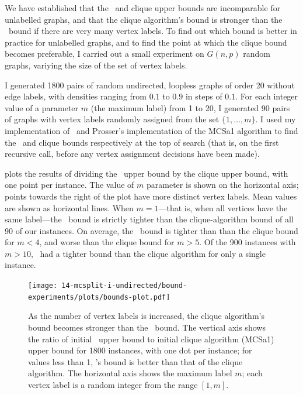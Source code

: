 We have established that the \McSplit\ and clique upper bounds are incomparable for unlabelled graphs,
and that the clique algorithm's bound is stronger than the \McSplit\ bound if there are very many vertex
labels.  To find out which bound is better in practice for unlabelled graphs, and to find the point
at which the clique bound becomes preferable, I carried out a small experiment on $G(n,p)$ random graphs,
variying the size of the set of vertex labels.

I generated 1800 pairs of random undirected, loopless graphs of order 20 without edge labels,
with densities ranging from $0.1$ to $0.9$
in steps of $0.1$.  For each integer value of a parameter $m$ (the maximum label) from 1 to 20, I generated
90 pairs of graphs with vertex labels randomly assigned from the set $\{1,\dots,m\}$.  I used my
implementation of \McSplit\ and Prosser's implementation of the MCSa1 algorithm
\cite{DBLP:journals/algorithms/Prosser12} to find the \McSplit\ and clique bounds respectively
at the top of search (that is, on the first recursive call, before any vertex assignment decisions
have been made).

 plots the results of dividing the \McSplit\ upper bound by the
clique upper bound, with one point per instance.  The value of $m$ parameter is shown on the horizontal
axis; points towards the right of the plot have more distinct vertex labels.  Mean values
are shown as horizontal lines.  When $m=1$---that is,
when all vertices have the same label---the \McSplit\ bound is strictly tighter than the clique-algorithm
bound of all 90 of our instances.  On average, the \McSplit\ bound is tighter than than the clique
bound for $m < 4$, and worse than the clique bound for $m > 5$.  Of the 900 instances with $m > 10$,
\McSplit\ had a tighter bound than the clique algorithm for only a single instance.

\begin{figure}[htb]
    \centering
    \texttt{[image: 14-mcsplit-i-undirected/bound-experiments/plots/bounds-plot.pdf]}
    \caption{As the number of vertex labels is increased, the clique algorithm's bound
    	becomes stronger than the \McSplit\ bound.
        The vertical axis shows the ratio of initial \McSplit\ upper bound
	to initial clique algorithm (MCSa1) upper bound for 1800 instances, with one dot per instance;
	for values less than 1, \McSplit's bound is better than that of the clique algorithm.
	The horizontal axis shows the maximum label $m$; each vertex label is a random integer 
	from the range $[1,m]$.}
    \label{figure:bound-ratio}
\end{figure}

